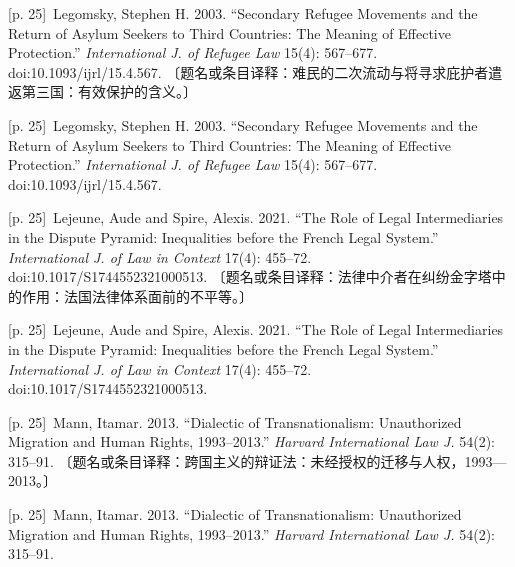 \documentclass[10pt,a4paper]{article}
\begin{document}
\noindent\begin{minipage}{\textwidth}\begin{minipage}[t]{\dimexpr.5\textwidth-4mm\relax}{\scriptsize\color{gray} [p. 25]}\ Legomsky, Stephen H. 2003. “Secondary Refugee Movements and the Return of Asylum Seekers to Third Countries: The Meaning of Effective Protection.” \textit{International J. of Refugee Law} 15(4): 567–677. doi:10.1093/ijrl/15.4.567. 〔题名或条目译释：难民的二次流动与将寻求庇护者遣返第三国：有效保护的含义。〕\par\end{minipage}\hfill\begin{minipage}[t]{\dimexpr.5\textwidth-4mm\relax}{\scriptsize\color{gray} [p. 25]}\ Legomsky, Stephen H. 2003. “Secondary Refugee Movements and the Return of Asylum Seekers to Third Countries: The Meaning of Effective Protection.” \textit{International J. of Refugee Law} 15(4): 567–677. doi:10.1093/ijrl/15.4.567.\par\end{minipage}\end{minipage}\par
\noindent\begin{minipage}{\textwidth}\begin{minipage}[t]{\dimexpr.5\textwidth-4mm\relax}{\scriptsize\color{gray} [p. 25]}\ Lejeune, Aude and Spire, Alexis. 2021. “The Role of Legal Intermediaries in the Dispute Pyramid: Inequalities before the French Legal System.” \textit{International J. of Law in Context} 17(4): 455–72. doi:10.1017/S1744552321000513. 〔题名或条目译释：法律中介者在纠纷金字塔中的作用：法国法律体系面前的不平等。〕\par\end{minipage}\hfill\begin{minipage}[t]{\dimexpr.5\textwidth-4mm\relax}{\scriptsize\color{gray} [p. 25]}\ Lejeune, Aude and Spire, Alexis. 2021. “The Role of Legal Intermediaries in the Dispute Pyramid: Inequalities before the French Legal System.” \textit{International J. of Law in Context} 17(4): 455–72. doi:10.1017/S1744552321000513.\par\end{minipage}\end{minipage}\par
\noindent\begin{minipage}{\textwidth}\begin{minipage}[t]{\dimexpr.5\textwidth-4mm\relax}{\scriptsize\color{gray} [p. 25]}\ Mann, Itamar. 2013. “Dialectic of Transnationalism: Unauthorized Migration and Human Rights, 1993–2013.” \textit{Harvard International Law J.} 54(2): 315–91. 〔题名或条目译释：跨国主义的辩证法：未经授权的迁移与人权，1993—2013。〕\par\end{minipage}\hfill\begin{minipage}[t]{\dimexpr.5\textwidth-4mm\relax}{\scriptsize\color{gray} [p. 25]}\ Mann, Itamar. 2013. “Dialectic of Transnationalism: Unauthorized Migration and Human Rights, 1993–2013.” \textit{Harvard International Law J.} 54(2): 315–91.\par\end{minipage}\end{minipage}\par
\end{document}
